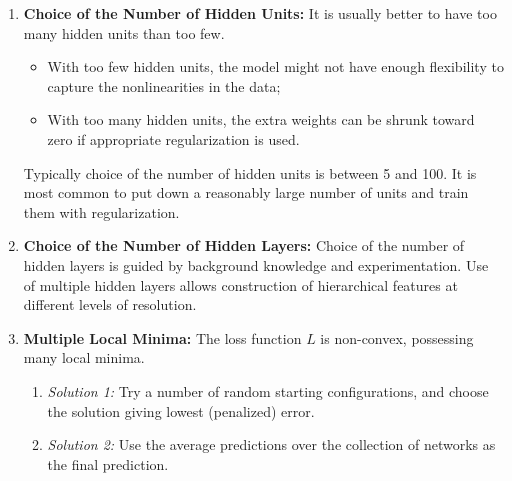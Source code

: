 \documentclass[12pt]{article}
\begin{document}
\begin{enumerate}[label=\textbf{\arabic*.}]
	\item \textbf{Choice of the Number of Hidden Units:} It is usually better to have too many hidden units than too few. 
	\begin{itemize}
		\item With too few hidden units, the model might not have enough flexibility to capture the nonlinearities in the data; 
		\item With too many hidden units, the extra weights can be shrunk toward zero if appropriate regularization is used. 
	\end{itemize}
	Typically choice of the number of hidden units is between 5 and 100. It is most common to put down a reasonably large number of units and train them with regularization. 
	
	\item \textbf{Choice of the Number of Hidden Layers:} Choice of the number of hidden layers is guided by background knowledge and experimentation. Use of multiple hidden layers allows construction of hierarchical features at different levels of resolution. 
	
	\item \textbf{Multiple Local Minima:} The loss function $L$ is non-convex, possessing many local minima. 
	\begin{enumerate}
		\item \textit{Solution 1:} Try a number of random starting configurations, and choose the solution giving lowest (penalized) error. 
		\item \textit{Solution 2:} Use the average predictions over the collection of networks as the final prediction. 
	\end{enumerate}

\end{enumerate}

\printbibliography
\end{document}
